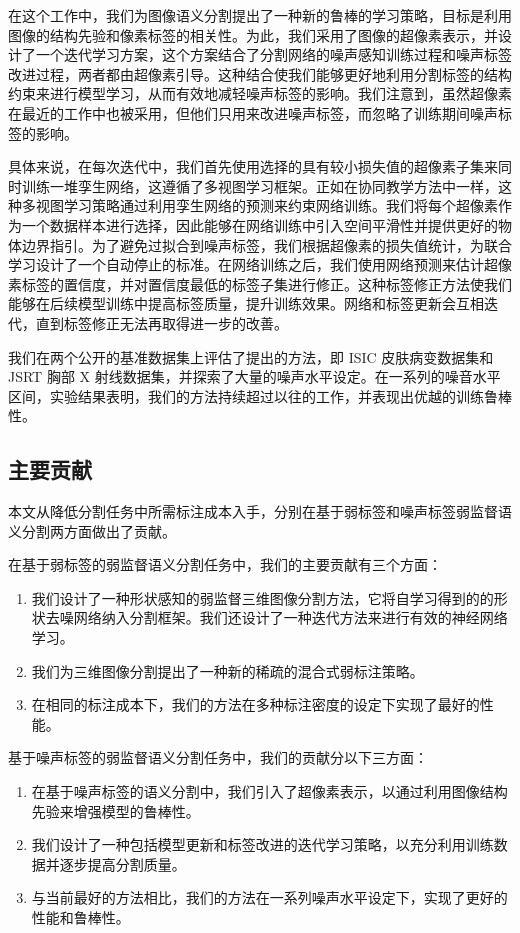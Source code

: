 在这个工作中，我们为图像语义分割提出了一种新的鲁棒的学习策略，目标是利用图像的结构先验和像素标签的相关性。为此，我们采用了图像的超像素表示，并设计了一个迭代学习方案，这个方案结合了分割网络的噪声感知训练过程和噪声标签改进过程，两者都由超像素引导。这种结合使我们能够更好地利用分割标签的结构约束来进行模型学习，从而有效地减轻噪声标签的影响。我们注意到，虽然超像素在最近的工作中也被采用\citep{li2019supervised}，但他们只用来改进噪声标签，而忽略了训练期间噪声标签的影响。

具体来说，在每次迭代中，我们首先使用选择的具有较小损失值的超像素子集来同时训练一堆孪生网络，这遵循了多视图学习框架\citep{Han2018CoteachingRT,Wei2020CombatingNL}。正如在协同教学方法中一样，这种多视图学习策略通过利用孪生网络的预测来约束网络训练。我们将每个超像素作为一个数据样本进行选择，因此能够在网络训练中引入空间平滑性并提供更好的物体边界指引。为了避免过拟合到噪声标签，我们根据超像素的损失值统计，为联合学习设计了一个自动停止的标准。在网络训练之后，我们使用网络预测来估计超像素标签的置信度，并对置信度最低的标签子集进行修正。这种标签修正方法使我们能够在后续模型训练中提高标签质量，提升训练效果。网络和标签更新会互相迭代，直到标签修正无法再取得进一步的改善。

我们在两个公开的基准数据集上评估了提出的方法，即 ISIC 皮肤病变数据集\citep{Gutman2018SkinLA}和 JSRT 胸部 X 射线数据集\citep{Ginneken2006SegmentationOA,Shiraishi2000DevelopmentOA}，并探索了大量的噪声水平设定。在一系列的噪音水平区间，实验结果表明，我们的方法持续超过以往的工作，并表现出优越的训练鲁棒性。

\subsection{主要贡献}
本文从降低分割任务中所需标注成本入手，分别在基于弱标签和噪声标签弱监督语义分割两方面做出了贡献。

在基于弱标签的弱监督语义分割任务中，我们的主要贡献有三个方面：
\begin{enumerate}
\item 我们设计了一种形状感知的弱监督三维图像分割方法，它将自学习得到的的形状去噪网络纳入分割框架。我们还设计了一种迭代方法来进行有效的神经网络学习。
\item 我们为三维图像分割提出了一种新的稀疏的混合式弱标注策略。
\item 在相同的标注成本下，我们的方法在多种标注密度的设定下实现了最好的性能。
\end{enumerate}


基于噪声标签的弱监督语义分割任务中，我们的贡献分以下三方面：
\begin{enumerate}
    \item 在基于噪声标签的语义分割中，我们引入了超像素表示，以通过利用图像结构先验来增强模型的鲁棒性。
    \item 我们设计了一种包括模型更新和标签改进的迭代学习策略，以充分利用训练数据并逐步提高分割质量。
    \item 与当前最好的方法相比，我们的方法在一系列噪声水平设定下，实现了更好的性能和鲁棒性。
\end{enumerate}

